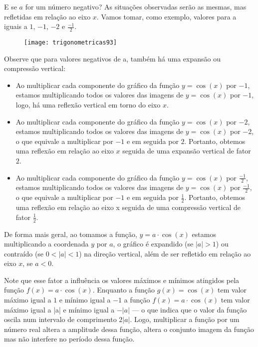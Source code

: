 E se $a$ for um número negativo? As situações observadas serão as mesmas, mas refletidas em relação ao eixo $x$. Vamos tomar, como exemplo, valores para a iguais a $1$, $-1$, $-2$ e  $\frac{-1}{2}$.

\begin{figure}[H]
\centering

\texttt{[image: trigonometricas93]}
\end{figure}

Observe que para valores negativos de a, também há uma expansão ou compressão vertical:

\begin{itemize}
\item Ao multiplicar cada componente do gráfico da função $y=\cos(x)$ por $-1$, estamos multiplicando todos os valores das imagens de $y=\cos(x)$ por $-1$, logo, há uma reflexão vertical em torno do eixo $x$.

\item Ao multiplicar cada componente do gráfico da função $y=\cos(x)$ por $-2$, estamos multiplicando todos os valores das imagens de $y=\cos(x)$ por $-2$, o que equivale a multiplicar por $-1$ e em seguida por $2$. Portanto, obtemos uma reflexão em relação ao eixo $x$ seguida de uma expansão vertical de fator $2$.

\item Ao multiplicar cada componente do gráfico da função $y=\cos(x)$ por  $\frac{-1}{2}$, estamos multiplicando todos os valores das imagens de $y=\cos(x)$ por $\frac{-1}{2}$, o que equivale a multiplicar por $-1$ e em seguida por $\frac{1}{2}$. Portanto, obtemos uma reflexão em relação ao eixo x seguida de uma compressão vertical de fator $\frac{1}{2}$.
\end{itemize}

 De forma mais geral, ao tomamos a função, $y=a\cdot\cos(x)$ estamos multiplicando a coordenada $y$ por $a$, o gráfico é expandido (se $|a|>1$) ou contraído (se $0<|a|< 1$) na direção vertical, além de ser refletido em relação ao eixo $x$, se $a < 0$.

Note que esse fator a influência os valores máximos e mínimos atingidos pela função $f(x)=a\cdot \cos(x)$. Enquanto a função $g(x)=\cos(x)$ tem valor máximo igual a $1$ e mínimo igual a $-1$ a função $f(x)=a\cdot\cos(x)$  tem valor máximo igual a |a| e mínimo igual a $-|a|$ --- o que indica que o valor da função oscila num intervalo de comprimento $2|a|$. Logo, multiplicar a função por um número real altera a amplitude dessa função, altera o conjunto imagem da função mas não interfere no período dessa função.

